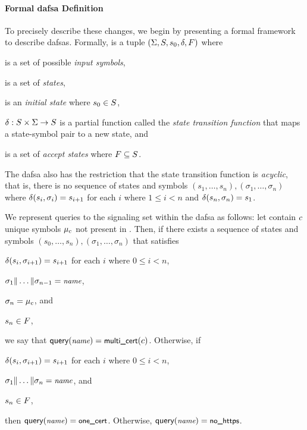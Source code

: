 \paragraph{Formal \ac{dafsa} Definition}

To precisely describe these changes, we begin by presenting a formal framework
to describe \acp{dafsa}. Formally,  is a tuple $(\Sigma, S,
s_0, \delta, F)$ where
\begin{inparaenum}
\item \symbols is a set of possible \emph{input symbols},
\item \states is a set of \emph{states},
\item \initstate is an \emph{initial state} where $s_0 \in S$,
\item $\delta: S \times \Sigma \to S$ is a partial function
  called the \emph{state transition function} that maps a state-symbol pair to a
  new state, and
\item \finalstates is a set of \emph{accept states} where $F
  \subseteq S$.
\end{inparaenum}
The \ac{dafsa} also has the restriction that the state transition function is
\emph{acyclic}, that is, there is no sequence of states and symbols $(s_1,
\ldots, s_n), (\sigma_1, \ldots, \sigma_n)$ where $\delta(s_i, \sigma_i) =
s_{i+1}$ for each $i$ where $1 \le i < n$ and $\delta(s_n, \sigma_n) = s_1$.

We represent queries to the signaling set within the \ac{dafsa} as follows: let
\states contain $c$ unique symbols $\mu_c$ not present in \httpsset. 
Then, if there exists a sequence of
states and symbols $(s_0, \ldots, s_n), (\sigma_1, \ldots, \sigma_n)$ that
satisfies
\begin{inparaenum}
\item $\delta(s_i, \sigma_{i+1}) = s_{i+1}$ for each $i$ where $0 \le i < n$,
\item $\sigma_1 \| \dots \| \sigma_{n-1} = \small{\emph{name}}$, 
\item $\sigma_n = \mu_c$, and
\item $s_n \in F$,
\end{inparaenum}
we say that $\textsf{query}(\small{\emph{name}}) = \textsf{multi\_cert}(c)$.
Otherwise, if
\begin{inparaenum}
\item $\delta(s_i, \sigma_{i+1}) = s_{i+1}$ for each $i$ where $0 \le i < n$,
\item $\sigma_1 \| \dots \| \sigma_{n} = \small{\emph{name}}$, and
\item $s_n \in F$,
\end{inparaenum}
then $\textsf{query}(\small{\emph{name}}) = \textsf{one\_cert}$. Otherwise, $\textsf{query}(\small{\emph{name}}) = \textsf{no\_https}$.

